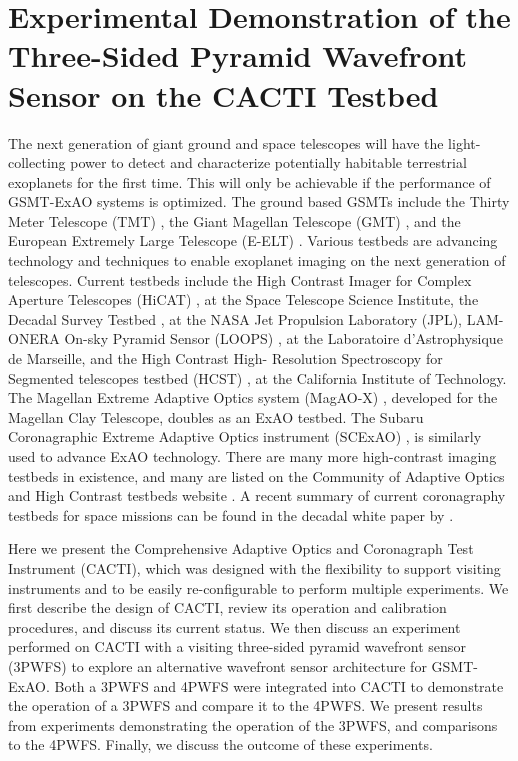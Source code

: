 \chapter{Experimental Demonstration of the Three-Sided Pyramid Wavefront Sensor on the CACTI Testbed}\label{CH6}

The next generation of giant ground and space telescopes will have the light-collecting power to detect and characterize potentially habitable terrestrial exoplanets for the first time. This will only be achievable if the performance of GSMT-ExAO systems is optimized. The ground based GSMTs include the Thirty Meter Telescope (TMT) \citep{chisholm2020thirty}, the Giant Magellan Telescope (GMT) \citep{fanson2020overview}, and the European Extremely Large Telescope (E-ELT) \citep{ramsay2020eso}. Various testbeds are advancing technology and techniques to enable exoplanet imaging on the next generation of telescopes. Current testbeds include the High Contrast Imager for Complex Aperture Telescopes (HiCAT) \citep{2014SPIE.9143E..27N}, at the Space Telescope Science Institute, the Decadal Survey Testbed \citep{ruane2019decadal}, at the NASA Jet Propulsion Laboratory (JPL), LAM-ONERA On-sky Pyramid Sensor (LOOPS) \citep{janin2019adaptive}, at the Laboratoire d'Astrophysique de Marseille, and the High Contrast High- Resolution Spectroscopy for Segmented telescopes testbed (HCST) \citep{jovanovic2018high}, at the California Institute of Technology. The Magellan Extreme Adaptive Optics system (MagAO-X) \citep{males2020magao}, developed for the Magellan Clay Telescope, doubles as an ExAO testbed. The Subaru Coronagraphic Extreme Adaptive Optics instrument (SCExAO) \citep{jovanovic2015subaru}, is similarly used to advance ExAO technology. There are many more high-contrast imaging testbeds in existence, and many are listed on the Community of Adaptive Optics and High Contrast testbeds website \citep{CHAOTIC}. A recent summary of current coronagraphy testbeds for space missions can be found in the decadal white paper by \cite{mazoyer2019high}.

Here we present the Comprehensive Adaptive Optics and Coronagraph Test Instrument (CACTI), which was designed with the flexibility to support visiting instruments and to be easily re-configurable to perform multiple experiments.  We first describe the design of CACTI, review its operation and calibration procedures, and discuss its current status. We then discuss an experiment performed on CACTI with a visiting three-sided pyramid wavefront sensor (3PWFS) to explore an alternative wavefront sensor architecture for GSMT-ExAO. Both a 3PWFS and 4PWFS were integrated into  CACTI to demonstrate the operation of a 3PWFS and compare it to the 4PWFS. We present results from experiments demonstrating the operation of the 3PWFS, and comparisons to the 4PWFS. Finally, we discuss the outcome of these experiments.


